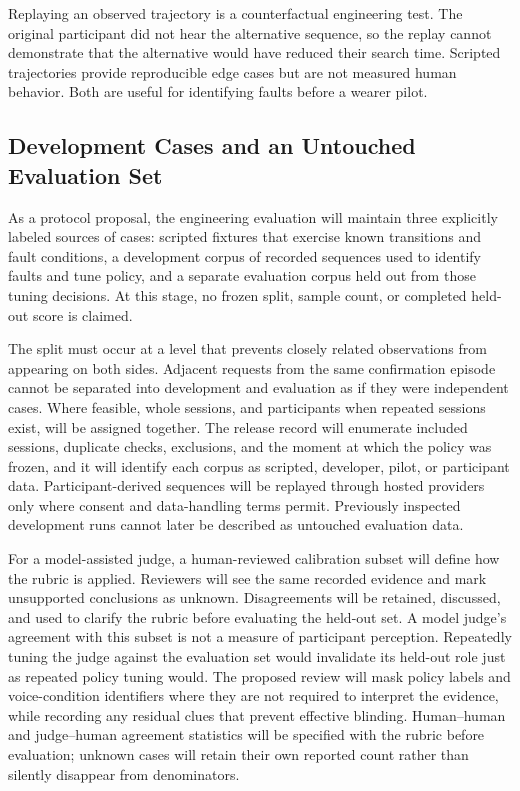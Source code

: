 Replaying an observed trajectory is a counterfactual engineering test. The original participant did not hear the alternative sequence, so the replay cannot demonstrate that the alternative would have reduced their search time. Scripted trajectories provide reproducible edge cases but are not measured human behavior. Both are useful for identifying faults before a wearer pilot.


\subsection{Development Cases and an Untouched Evaluation Set}
As a protocol proposal, the engineering evaluation will maintain three explicitly labeled sources of cases: scripted fixtures that exercise known transitions and fault conditions, a development corpus of recorded sequences used to identify faults and tune policy, and a separate evaluation corpus held out from those tuning decisions. At this stage, no frozen split, sample count, or completed held-out score is claimed.

The split must occur at a level that prevents closely related observations from appearing on both sides. Adjacent requests from the same confirmation episode cannot be separated into development and evaluation as if they were independent cases. Where feasible, whole sessions, and participants when repeated sessions exist, will be assigned together. The release record will enumerate included sessions, duplicate checks, exclusions, and the moment at which the policy was frozen, and it will identify each corpus as scripted, developer, pilot, or participant data. Participant-derived sequences will be replayed through hosted providers only where consent and data-handling terms permit. Previously inspected development runs cannot later be described as untouched evaluation data.

For a model-assisted judge, a human-reviewed calibration subset will define how the rubric is applied. Reviewers will see the same recorded evidence and mark unsupported conclusions as unknown. Disagreements will be retained, discussed, and used to clarify the rubric before evaluating the held-out set. A model judge's agreement with this subset is not a measure of participant perception. Repeatedly tuning the judge against the evaluation set would invalidate its held-out role just as repeated policy tuning would. The proposed review will mask policy labels and voice-condition identifiers where they are not required to interpret the evidence, while recording any residual clues that prevent effective blinding. Human--human and judge--human agreement statistics will be specified with the rubric before evaluation; unknown cases will retain their own reported count rather than silently disappear from denominators.

